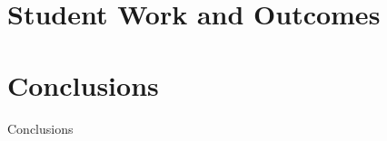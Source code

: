 \documentclass{sig-alternate}
\begin{document}
\section{Student Work and Outcomes}

\section{Conclusions}
Conclusions


%

%
%
\end{document}
